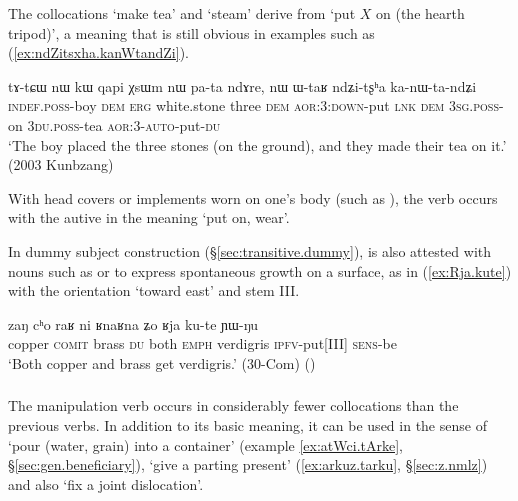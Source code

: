 The collocations  `make tea' and  `steam' derive from `put $X$ on (the hearth tripod)', a meaning that is still obvious in examples such as  (\ref{ex:ndZitsxha.kanWtandZi}).

\begin{exe}
\ex \label{ex:ndZitsxha.kanWtandZi}
\gll tɤ-tɕɯ nɯ kɯ qapi χsɯm nɯ pa-ta ndɤre, nɯ ɯ-taʁ  ndʑi-tʂʰa ka-nɯ-ta-ndʑi   \\
\textsc{indef}.\textsc{poss}-boy \textsc{dem} \textsc{erg} white.stone three \textsc{dem} \textsc{aor}:3\flobv{}:\textsc{down}-put \textsc{lnk} \textsc{dem} \textsc{3sg}.\textsc{poss}-on \textsc{3du}.\textsc{poss}-tea \textsc{aor}:3\flobv{}-\textsc{auto}-put-\textsc{du} \\
\glt `The boy placed the three stones (on the ground), and they made their tea on it.'  (2003 Kunbzang)
\end{exe}

With head covers or implements worn on one's body (such as ), the verb  occurs with the autive in the meaning `put on, wear'.
 
In dummy subject construction (§\ref{sec:transitive.dummy}),  is also attested with nouns such as  or  to express  spontaneous growth on a surface, as in (\ref{ex:Rja.kute}) with the orientation `toward east'  and stem III.

\begin{exe}
\ex \label{ex:Rja.kute}
\gll zaŋ cʰo raʁ ni ʁnaʁna ʑo ʁja ku-te ɲɯ-ŋu \\
copper \textsc{comit} brass \textsc{du} both \textsc{emph} verdigris \textsc{ipfv}-put[III] \textsc{sens}-be \\
\glt `Both copper and brass get verdigris.' (30-Com)
()
\end{exe}
 
\subsubsection{ } \label{sec:rku.lv}
The manipulation verb  occurs in considerably fewer collocations than the previous verbs. In addition to its basic meaning, it can be used in the sense of `pour (water, grain) into a container' (example \ref{ex:atWci.tArke}, §\ref{sec:gen.beneficiary}), `give a parting present' (\ref{ex:arkuz.tarku}, §\ref{sec:z.nmlz}) and also `fix a joint dislocation'.

